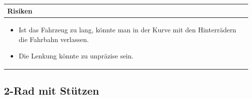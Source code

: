 \begin{table}[h]
\begin{tabular}{p{}p{}}


 \textbf{Risiken} & \\ \hline
	 
\begin{itemize}
\item Ist das Fahrzeug zu lang, könnte man in der Kurve mit den Hinterrädern die Fahrbahn verlassen.
\item Die Lenkung könnte zu unpräzise sein.
\end{itemize}

 
\end{tabular}
\end{table}

\pagebreak


\subsection{2-Rad mit Stützen}

